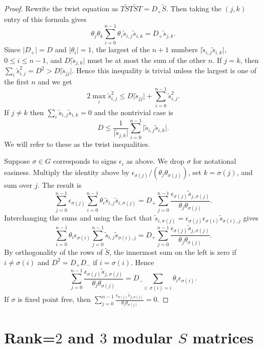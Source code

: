 \documentclass[12pt,psamsfonts]{amsart}
\newcommand{\e}{{\epsilon}}
\numberwithin{equation}{section}
\theoremstyle{definition}
\begin{document}
\begin{proof}

Rewrite the twist equation as $T \tilde S T \tilde S T = D_+
\tilde S$. Then taking the $(j,k)$ entry of this formula gives
$$\theta_j \theta_k \sum_{i=0}^{n-1} \theta_i \tilde s_{i,j}\tilde s_{i,k} =
D_+ \tilde s_{j,k}.$$ Since $\vert D_+\vert=D$ and $\vert
\theta_i\vert=1$, the largest of the $n+1$ numbers $\vert \tilde
s_{i,j}\tilde s_{i,k}\vert$, $0\le i\le n-1$, and $D \vert \tilde
s_{j,k}\vert$ must be at most the sum of the other $n$. If $j=k$,
then $\sum_i \tilde s_{i,j}^2 = D^2 > D\vert \tilde{s}_{jj}\vert
$. Hence this inequality is trivial unless the largest is one of
the first $n$ and we get
$$2 \max_i \tilde s_{i,j}^2 \le D \vert \tilde{s}_{jj}\vert+ \sum_{i=0}^{n-1} \tilde s_{i,j}^2.$$
If $j\ne k$ then $\sum_i \tilde s_{i,j}\tilde s_{i,k} = 0$ and the
nontrivial case is
$$D \le \frac{1}{\vert \tilde s_{j,k}\vert} \sum_{i=0}^{n-1}
\vert \tilde s_{i,j}\tilde s_{i,k}\vert.$$ We will refer to these
as the twist inequalities.

Suppose $\sigma\in G$ corresponds to signs $\e_i$ as above.  We
drop $\sigma$ for notational easiness.  Multiply the identity
above by $\e_{\sigma(j)}/(\theta_j \theta_{\sigma(j)})$, set
$k=\sigma(j)$, and sum over $j$. The result is
$$\sum_{j=0}^{n-1} \e_{\sigma(j)} \sum_{i=0}^{n-1} \theta_i \tilde s_{i,j}\tilde
s_{i,\sigma(j)} = D_+ \sum_{j=0}^{n-1} \frac{\e_{\sigma(j)} \tilde
s_{j,\sigma(j)}}{\theta_j \theta_{\sigma(j)}}.$$ Interchanging the
sums and using the fact that $\tilde
s_{i,\sigma(j)}=\e_{\sigma(j)} \e_{\sigma(i)} \tilde
s_{\sigma(i),j}$ gives
$$\sum_{i=0}^{n-1} \theta_i \e_{\sigma(i)} \sum_{j=0}^{n-1} \tilde s_{i,j}\tilde
s_{\sigma(i),j} = D_+ \sum_{j=0}^{n-1} \frac{\e_{\sigma(j)} \tilde
s_{j,\sigma(j)}}{\theta_j \theta_{\sigma(j)}}.$$ By orthogonality
of the rows of $\tilde S$, the innermost sum on the left is zero
if $i\ne \sigma(i)$ and $D^2=D_+D_-$ if $i=\sigma(i)$. Hence
$$\sum_{j=0}^{n-1} \frac{\e_{\sigma(j)} \tilde s_{j,\sigma(j)}}{\theta_j
\theta_{\sigma(j)}} = D_- \sum_{i:~\sigma(i)=i} \theta_i
\e_{\sigma(i)}.$$ If $\sigma$ is fixed point free, then
$\sum_{j=0}^{n-1} \frac{\e_{\sigma(j)} \tilde
s_{j,\sigma(j)}}{\theta_j \theta_{\sigma(j)}} =0$.

\end{proof}


\section{Rank=$2$ and $3$ modular $S$ matrices}\label{rank23}
\end{document}
